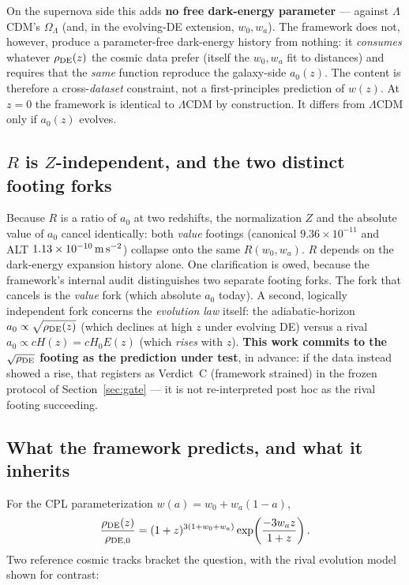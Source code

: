 \documentclass[11pt,a4paper]{article}
\newcommand{\rhoDE}{\rho_{\rm DE}}
\newcommand{\azero}{a_0}
\newcommand{\msms}{{\rm m\,s^{-2}}}
\begin{document}
On the supernova side this adds \textbf{no free dark-energy parameter} ---
against $\Lambda$CDM's $\Omega_\Lambda$ (and, in the evolving-DE extension,
$w_0,w_a$). The framework does not, however, produce a parameter-free
dark-energy history from nothing: it \emph{consumes} whatever $\rhoDE(z)$ the
cosmic data prefer (itself the $w_0,w_a$ fit to distances) and requires that
the \emph{same} function reproduce the galaxy-side $\azero(z)$. The content is
therefore a cross-\emph{dataset} constraint, not a first-principles prediction
of $w(z)$. At $z=0$ the framework is identical to $\Lambda$CDM by
construction. It differs from $\Lambda$CDM only if $\azero(z)$ evolves.

\subsection{$R$ is $Z$-independent, and the two distinct footing forks}
\label{sec:forks}

Because $R$ is a ratio of $\azero$ at two redshifts, the normalization $Z$ and
the absolute value of $\azero$ cancel identically: both \emph{value} footings
(canonical $9.36\times10^{-11}$ and ALT $1.13\times10^{-10}\,\msms$) collapse
onto the same $R(w_0,w_a)$. $R$ depends on the dark-energy expansion history
alone. One clarification is owed, because the framework's internal audit
distinguishes two separate footing forks. The fork that cancels is the
\emph{value} fork (which absolute $\azero$ today). A second, logically
independent fork concerns the \emph{evolution law} itself: the
adiabatic-horizon $\azero\propto\sqrt{\rhoDE(z)}$ (which declines at high $z$
under evolving DE) versus a rival $\azero\propto cH(z)=cH_0E(z)$ (which
\emph{rises} with $z$). \textbf{This work commits to the $\sqrt{\rhoDE}$
footing as the prediction under test}, in advance: if the data instead showed
a rise, that registers as Verdict~C (framework strained) in the frozen
protocol of Section~\ref{sec:gate} --- it is not re-interpreted post hoc as
the rival footing succeeding.

\subsection{What the framework predicts, and what it inherits}
\label{sec:tracks}

For the CPL parameterization $w(a)=w_0+w_a(1-a)$,
\begin{equation}
\frac{\rhoDE(z)}{\rho_{\rm DE,0}}=(1+z)^{3(1+w_0+w_a)}
\exp\!\left(\frac{-3w_a z}{1+z}\right).
\label{eq:cpl}
\end{equation}
Two reference cosmic tracks bracket the question, with the rival
evolution model shown for contrast:
\end{document}
